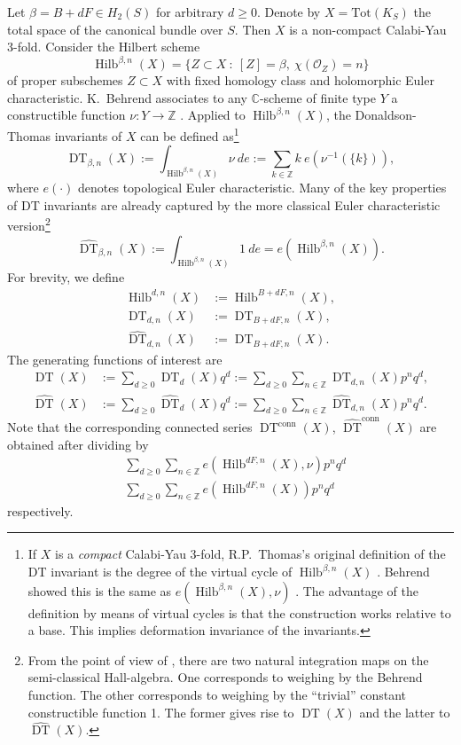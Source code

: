 \documentclass{amsart}
\theoremstyle{definition}
\newcommand{\CC} {\mathbb{C}}          %
\newcommand{\ZZ} {\mathbb{Z}}		%
\renewcommand{\O}{\mathcal{O}}
\newcommand{\Hilb}{\operatorname{Hilb}}
\newcommand{\DT}{\operatorname{DT}}
\newcommand{\conn}{\operatorname{conn}}
\begin{document}
Let $\beta = B+dF \in H_2(S)$ for arbitrary $d \geq 0$. Denote by $X = \mathrm{Tot}(K_S)$ the total space of the canonical bundle over $S$. Then $X$ is a non-compact Calabi-Yau 3-fold. Consider the Hilbert scheme
$$
\Hilb^{\beta,n}(X) = \{ Z \subset X \ : \ [Z] = \beta, \ \chi(\O_Z) = n\}
$$
of proper subschemes $Z \subset X$ with fixed homology class and holomorphic Euler characteristic. K.~Behrend associates to any $\CC$-scheme of finite type $Y$ a constructible function $\nu : Y \rightarrow \ZZ$ \cite{Beh}. Applied to $\Hilb^{\beta,n}(X)$, the Donaldson-Thomas invariants of $X$ can be defined as\footnote{If $X$ is a \emph{compact} Calabi-Yau 3-fold, R.P.~Thomas's original definition of the DT invariant is the degree of the virtual cycle of $\Hilb^{\beta,n}(X)$ \cite{Tho}. Behrend showed this is the same as $e(\Hilb^{\beta,n}(X),\nu)$ \cite{Beh}. The advantage of the definition by means of virtual cycles is that the construction works relative to a base. This implies deformation invariance of the invariants.} 
$$
\DT_{\beta,n}(X) := \int_{\Hilb^{\beta,n}(X)} \nu \ de := \sum_{k \in \ZZ} k \ e(\nu^{-1}(\{k\})),
$$
where $e(\cdot)$ denotes topological Euler characteristic. Many of the key properties of DT invariants are already captured by the more classical Euler characteristic version\footnote{From the point of view of \cite{JS, Bri}, there are two natural integration maps on the semi-classical Hall-algebra. One corresponds to weighing by the Behrend function. The other corresponds to weighing by the ``trivial'' constant constructible function 1. The former gives rise to $\DT(X)$ and the latter to $\widehat{\DT}(X)$.}
$$
\widehat{\DT}_{\beta,n}(X) := \int_{\Hilb^{\beta,n}(X)} 1 \ de = e(\Hilb^{\beta,n}(X)).
$$
For brevity, we define
\begin{align*}
\Hilb^{d,n}(X) &:=\Hilb^{B+dF,n}(X), \\
\DT_{d,n}(X) &:= \DT_{B+dF,n}(X), \\
\widehat{\DT}_{d,n}(X) &:= \DT_{B+dF,n}(X).
\end{align*}
The generating functions of interest are
\begin{align*}
\DT(X) &:= \sum_{d \geq 0} \DT_d(X) q^d := \sum_{d \geq 0} \sum_{n \in \ZZ} \DT_{d,n}(X) p^n q^d, \\
\widehat{\DT}(X) &:= \sum_{d \geq 0} \widehat{\DT}_d(X) q^d := \sum_{d \geq 0} \sum_{n \in \ZZ} \widehat{\DT}_{d,n}(X) p^n q^d.
\end{align*}
Note that the corresponding connected series $\DT^{\conn}(X)$, $\widehat{\DT}^{\conn}(X)$ are obtained after dividing by
\begin{align*}
&\sum_{d \geq 0} \sum_{n \in \ZZ} e(\Hilb^{dF,n}(X),\nu) p^n q^d \\
&\sum_{d \geq 0} \sum_{n \in \ZZ} e(\Hilb^{dF,n}(X)) p^n q^d
\end{align*}
respectively.
\end{document}
